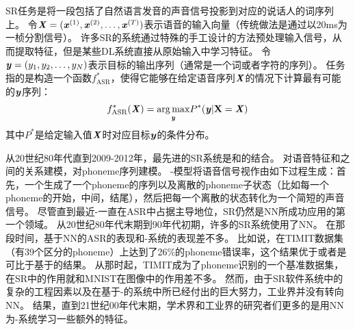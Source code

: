 \section{}
\label{sec:speech_recognition}

\gls{SR}任务是将一段包括了自然语言发音的声音信号投影到对应的说话人的词序列上。
令$\boldsymbol{\mathit{X}}=(\boldsymbol{\mathit{x}}^{(1)},\boldsymbol{\mathit{x}}^{(2)},\ldots,\boldsymbol{\mathit{x}}^{(T)})$表示语音的输入向量（传统做法是通过以20ms为一桢分割信号）。
许多\gls{SR}的系统通过特殊的手工设计的方法预处理输入信号，从而提取特征，但是某些\gls{DL}系统\citep{jaitly2011learning}直接从原始输入中学习特征。
令$\boldsymbol{\mathit{y}}=(y_{1},y_{2},\ldots,y_{N})$表示目标的输出序列（通常是一个词或者字符的序列）。
任务指的是构造一个函数$f^*_{\text{ASR}}$，使得它能够在给定语音序列$\boldsymbol{\mathit{X}}$的情况下计算最有可能的$\boldsymbol{\mathit{y}}$序列：
\begin{align}
\label{eqn:124}
f^*_{\text{ASR}}(\boldsymbol{\mathit{X}}) =  \underset{\boldsymbol{\mathit{y}}}{\arg\max}  P^*(\boldsymbol{\mathit{y}} \vert \boldsymbol{\mathrm{X}} = \boldsymbol{\mathit{X}})
\end{align}
其中$P^*$是给定输入值$\boldsymbol{\mathit{X}}$时对应目标$\boldsymbol{\mathit{y}}$的条件分布。

从20世纪80年代直到2009-2012年，最先进的\gls{SR}系统是和的结合。
对语音特征和之间的关系建模\citep{Bahl87}，对\gls{phoneme}序列建模。
-模型将语音信号视作由如下过程生成：首先，一个生成了一个\gls{phoneme}的序列以及离散的\gls{phoneme}子状态（比如每一个\gls{phoneme}的开始，中间，结尾），然后把每一个离散的状态转化为一个简短的声音信号。
尽管直到最近-一直在\gls{ASR}中占据主导地位，\gls{SR}仍然是\gls{NN}所成功应用的第一个领域。
从20世纪80年代末期到90年代初期，许多的\gls{SR}系统使用了\gls{NN}\citep{Bourlard-cspla89,Waibel89b,Robinson+Fallside91,Bengio91z,Bengio92c,Konig96}。
在那段时间，基于\gls{NN}的\gls{ASR}的表现和-系统的表现差不多。
比如说，\citet{Robinson+Fallside91}在TIMIT数据集\citep{garofolo1993darpa}（有39个区分的\gls{phoneme}）上达到了26\%的\gls{phoneme}错误率，这个结果优于或者是可比于基于的结果。
从那时起，TIMIT成为了\gls{phoneme}识别的一个基准数据集，在\gls{SR}中的作用就和MNIST在图像中的作用差不多。
然而，由于\gls{SR}软件系统中的复杂的工程因素以及在基于-的系统中所已经付出的巨大努力，工业界并没有转向\gls{NN}。
结果，直到21世纪00年代末期，学术界和工业界的研究者们更多的是用\gls{NN}为-系统学习一些额外的特征。


